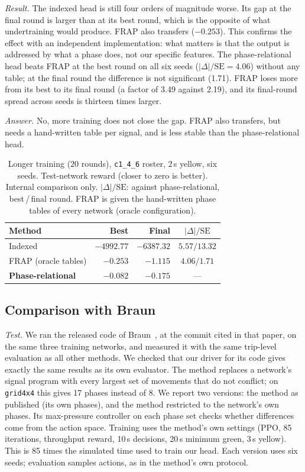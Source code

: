 \documentclass[conference]{IEEEtran}
\begin{document}
\emph{Result.} The indexed head is still four orders of magnitude worse. Its gap at the
final round is larger than at its best round, which is the opposite of what undertraining
would produce. FRAP also transfers ($-0.253$). This confirms the effect with an independent
implementation: what matters is that the output is addressed by what a phase does, not
our specific features. The phase-relational head beats FRAP at the best round on all six
seeds ($|\Delta|/\mathrm{SE}=4.06$) without any table; at the final round the difference
is not significant (1.71). FRAP loses more from its best to its final round (a factor of
3.49 against 2.19), and its final-round spread across seeds is thirteen times larger.

\emph{Answer.} No, more training does not close the gap. FRAP also transfers, but needs a
hand-written table per signal, and is less stable than the phase-relational head.

\begin{table}[ht]
\caption{Longer training ($20$ rounds), \texttt{c1\_4\_6} roster, $2$\,s yellow, six
seeds. Test-network reward (closer to zero is better). Internal comparison only.
$|\Delta|/\mathrm{SE}$: against phase-relational, best\,/\,final round. FRAP is given the
hand-written phase tables of every network (oracle configuration).}
\label{tab:budget}
\centering\scriptsize\setlength{\tabcolsep}{4pt}
\begin{tabular}{@{}lrrc@{}}
\toprule
Method & Best & Final & $|\Delta|/\mathrm{SE}$ \\
\midrule
Indexed & $-4992.77$ & $-6387.32$ & $5.57 / 13.32$ \\
FRAP (oracle tables) & $-0.253$ & $-1.115$ & $4.06 / 1.71$ \\
\textbf{Phase-relational} & $\mathbf{-0.082}$ & $\mathbf{-0.175}$ & --- \\
\bottomrule
\end{tabular}
\end{table}

\subsection{Comparison with Braun}\label{sec:braun}
\emph{Test.} We ran the released code of Braun~\cite{graphiface}, at the commit cited in
that paper, on the same three training networks, and measured it with the same trip-level
evaluation as all other methods. We checked that our driver for its code gives exactly the
same results as its own evaluator. The method replaces a network's signal program with
every largest set of movements that do not conflict; on \texttt{grid4x4} this gives 17
phases instead of 8. We report two versions: the method as published (its own phases), and
the method restricted to the network's own phases. Its max-pressure controller on each phase
set checks whether differences come from the action space. Training uses the method's own
settings (PPO, 85 iterations, throughput reward, 10\,s decisions, 20\,s minimum green, 3\,s
yellow). This is 85 times the simulated time used to train our head. Each version uses six
seeds; evaluation samples actions, as in the method's own protocol.
\end{document}
